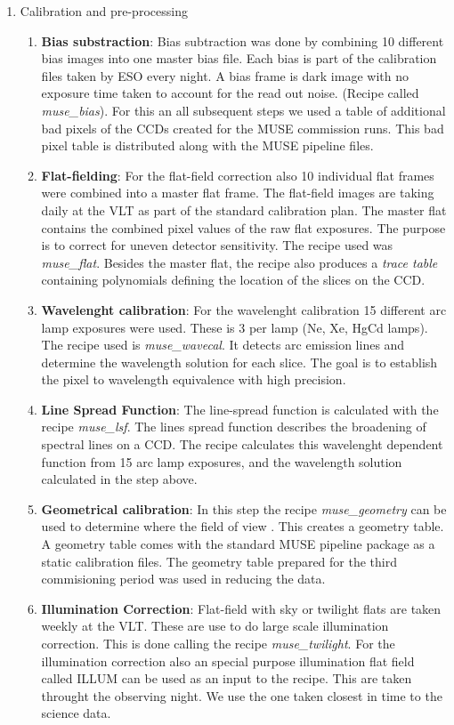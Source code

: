 \begin{enumerate}
        \item Calibration and pre-processing
                \begin{enumerate}[I]
			\item \textbf{Bias substraction}: Bias subtraction was done by combining 10 different bias images into one master bias file. Each bias is part of the calibration files taken by ESO every night. A bias frame is dark image with no exposure time taken to account for the read out noise. (Recipe called \emph{muse\_bias}). For this an all subsequent steps we used a table of additional bad pixels of the CCDs created for the MUSE commission runs. This bad pixel table is distributed along with the MUSE pipeline files. 
			\item \textbf{Flat-fielding}: For the flat-field correction also 10 individual flat frames were combined into a master flat frame. The flat-field images are taking daily at the VLT as part of the standard calibration plan.  The master flat  contains  the  combined  pixel  values  of  the  raw  flat exposures. The purpose is to correct for uneven detector sensitivity. The recipe used was \emph{muse\_flat}. Besides the master flat, the recipe also produces a \emph{trace table} containing polynomials defining the location of the slices on the CCD. 
			\item \textbf{Wavelenght calibration}: For the wavelenght calibration 15 different arc lamp exposures were used. These is 3 per lamp (Ne, Xe, HgCd lamps). The recipe used is \emph{muse\_wavecal}. It detects arc emission lines and determine the wavelength solution for each slice. The goal is to establish the pixel to wavelength equivalence with high precision.
			\item \textbf{Line Spread Function}: The line-spread function is calculated with the recipe \emph{muse\_lsf}. The lines spread function describes the broadening of spectral lines on a CCD. The recipe calculates this  wavelenght dependent function from 15 arc lamp exposures, and the wavelength solution calculated in the step above.  
			\item \textbf{Geometrical calibration}: In this step the recipe \emph{muse\_geometry} can be used to determine where the field of view . This creates a geometry table. A geometry table comes with the standard MUSE pipeline package as a static calibration files. The geometry table prepared for the third commisioning period was used in reducing the data. 
			\item \textbf{Illumination Correction}: Flat-field with sky or twilight flats are taken weekly at the VLT. These are use to do large scale illumination correction. This is done calling the recipe \emph{muse\_twilight}. For the illumination correction also an special purpose  illumination flat field called ILLUM can be used as an input to the recipe. This are taken throught the observing night. We use the one taken closest in time to the science data.  

\end{enumerate}
\end{enumerate}
